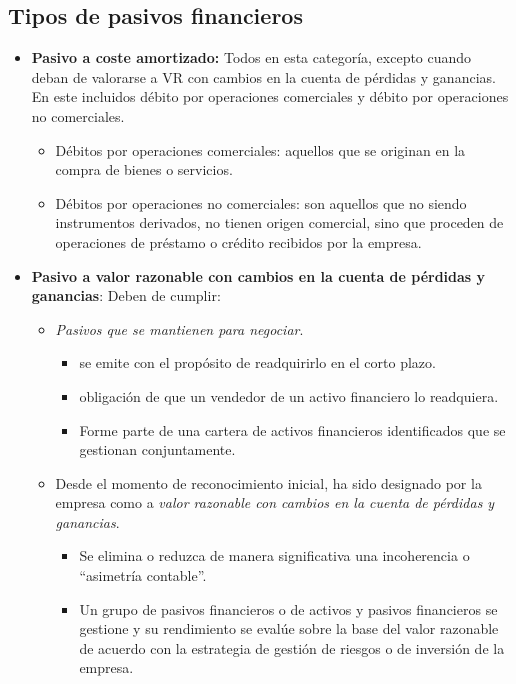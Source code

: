 \subsection{Tipos de pasivos financieros}
\begin{itemize}
    \item \textbf{Pasivo a coste amortizado:} Todos en esta categoría, excepto cuando deban de valorarse a VR con cambios en la cuenta de pérdidas y ganancias. En este incluidos débito por operaciones comerciales y débito por operaciones no comerciales.
    \begin{itemize}
        \item Débitos por operaciones comerciales: aquellos que se originan en la compra de bienes o servicios.
        \item Débitos por operaciones no comerciales: son aquellos que no siendo instrumentos derivados, no tienen origen comercial, sino que proceden de operaciones de préstamo o crédito recibidos por la empresa.
    \end{itemize}
    \item \textbf{Pasivo a valor razonable con cambios en la cuenta de pérdidas y ganancias}: Deben de cumplir:
    \begin{itemize}
        \item \textit{Pasivos que se mantienen para negociar}.
        \begin{itemize}
            \item se emite con el propósito de readquirirlo en el corto plazo.
            \item obligación de que un vendedor de un activo financiero lo readquiera.
            \item Forme parte de una cartera de activos financieros identificados que se gestionan conjuntamente.
        \end{itemize}
        \item Desde el momento de reconocimiento inicial, ha sido designado por la empresa como a \textit{valor razonable con cambios en la cuenta de pérdidas y ganancias}.
        \begin{itemize}
            \item Se elimina o reduzca de manera significativa una incoherencia o ``asimetría contable''.
            \item Un grupo de pasivos financieros o de activos y pasivos financieros se gestione y su rendimiento se evalúe sobre la base del valor razonable de acuerdo con la estrategia de gestión de riesgos o de inversión de la empresa.
        \end{itemize}
    \end{itemize}
\end{itemize}

